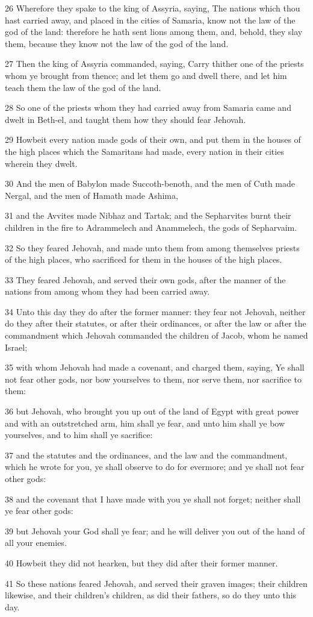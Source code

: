 \par 26 Wherefore they spake to the king of Assyria, saying, The nations which thou hast carried away, and placed in the cities of Samaria, know not the law of the god of the land: therefore he hath sent lions among them, and, behold, they slay them, because they know not the law of the god of the land.
\par 27 Then the king of Assyria commanded, saying, Carry thither one of the priests whom ye brought from thence; and let them go and dwell there, and let him teach them the law of the god of the land.
\par 28 So one of the priests whom they had carried away from Samaria came and dwelt in Beth-el, and taught them how they should fear Jehovah.
\par 29 Howbeit every nation made gods of their own, and put them in the houses of the high places which the Samaritans had made, every nation in their cities wherein they dwelt.
\par 30 And the men of Babylon made Succoth-benoth, and the men of Cuth made Nergal, and the men of Hamath made Ashima,
\par 31 and the Avvites made Nibhaz and Tartak; and the Sepharvites burnt their children in the fire to Adrammelech and Anammelech, the gods of Sepharvaim.
\par 32 So they feared Jehovah, and made unto them from among themselves priests of the high places, who sacrificed for them in the houses of the high places.
\par 33 They feared Jehovah, and served their own gods, after the manner of the nations from among whom they had been carried away.
\par 34 Unto this day they do after the former manner: they fear not Jehovah, neither do they after their statutes, or after their ordinances, or after the law or after the commandment which Jehovah commanded the children of Jacob, whom he named Israel;
\par 35 with whom Jehovah had made a covenant, and charged them, saying, Ye shall not fear other gods, nor bow yourselves to them, nor serve them, nor sacrifice to them:
\par 36 but Jehovah, who brought you up out of the land of Egypt with great power and with an outstretched arm, him shall ye fear, and unto him shall ye bow yourselves, and to him shall ye sacrifice:
\par 37 and the statutes and the ordinances, and the law and the commandment, which he wrote for you, ye shall observe to do for evermore; and ye shall not fear other gods:
\par 38 and the covenant that I have made with you ye shall not forget; neither shall ye fear other gods:
\par 39 but Jehovah your God shall ye fear; and he will deliver you out of the hand of all your enemies.
\par 40 Howbeit they did not hearken, but they did after their former manner.
\par 41 So these nations feared Jehovah, and served their graven images; their children likewise, and their children's children, as did their fathers, so do they unto this day.

